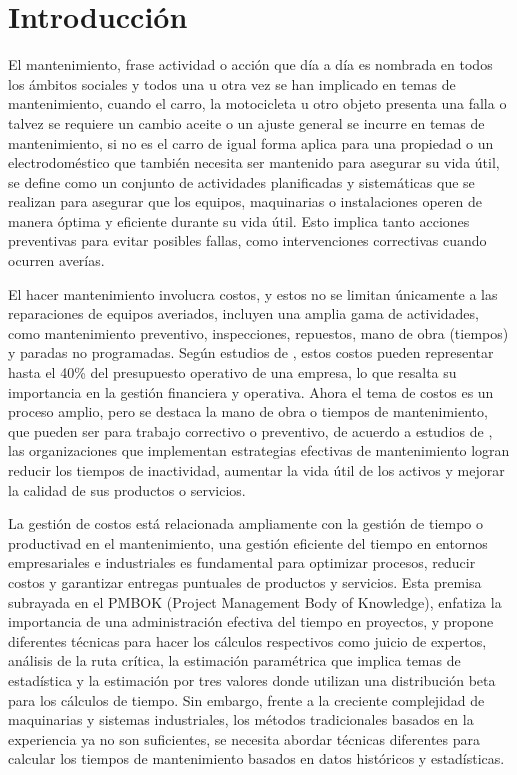 \documentclass[
  11pt,
  bookmarksnumbered]{article}
\begin{document}
\newpage

\hypertarget{introducciuxf3n}{%
\section{Introducción}\label{introducciuxf3n}}

El mantenimiento, frase actividad o acción que día a día es nombrada en todos los ámbitos sociales y todos una u otra vez se han implicado en temas de mantenimiento, cuando el carro, la motocicleta u otro objeto presenta una falla o talvez se requiere un cambio aceite o un ajuste general se incurre en temas de mantenimiento, si no es el carro de igual forma aplica para una propiedad o un electrodoméstico que también necesita ser mantenido para asegurar su vida útil, se define como un conjunto de actividades planificadas y sistemáticas que se realizan para asegurar que los equipos, maquinarias o instalaciones operen de manera óptima y eficiente durante su vida útil.
Esto implica tanto acciones preventivas para evitar posibles fallas, como intervenciones correctivas cuando ocurren averías.

El hacer mantenimiento involucra costos, y estos no se limitan únicamente a las reparaciones de equipos averiados, incluyen una amplia gama de actividades, como mantenimiento preventivo, inspecciones, repuestos, mano de obra (tiempos) y paradas no programadas.
Según estudios de \textcite{Garcia2017}, estos costos pueden representar hasta el 40\% del presupuesto operativo de una empresa, lo que resalta su importancia en la gestión financiera y operativa.
Ahora el tema de costos es un proceso amplio, pero se destaca la mano de obra o tiempos de mantenimiento, que pueden ser para trabajo correctivo o preventivo, de acuerdo a estudios de \textcite{Martinez2020}, las organizaciones que implementan estrategias efectivas de mantenimiento logran reducir los tiempos de inactividad, aumentar la vida útil de los activos y mejorar la calidad de sus productos o servicios.

La gestión de costos está relacionada ampliamente con la gestión de tiempo o productivad en el mantenimiento, una gestión eficiente del tiempo en entornos empresariales e industriales es fundamental para optimizar procesos, reducir costos y garantizar entregas puntuales de productos y servicios.
Esta premisa subrayada en el PMBOK (Project Management Body of Knowledge), enfatiza la importancia de una administración efectiva del tiempo en proyectos, y propone diferentes técnicas para hacer los cálculos respectivos como juicio de expertos, análisis de la ruta crítica, la estimación paramétrica que implica temas de estadística y la estimación por tres valores donde utilizan una distribución beta para los cálculos de tiempo.
Sin embargo, frente a la creciente complejidad de maquinarias y sistemas industriales, los métodos tradicionales basados en la experiencia ya no son suficientes, se necesita abordar técnicas diferentes para calcular los tiempos de mantenimiento basados en datos históricos y estadísticas.
\end{document}
